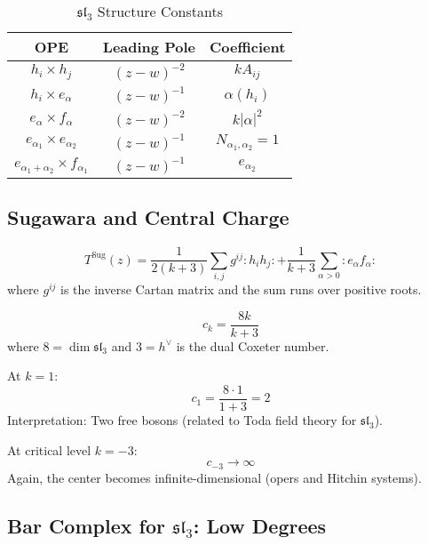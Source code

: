 \begin{table}[h]
\centering
\caption{$\mathfrak{sl}_3$ Structure Constants}
\begin{tabular}{|c|c|c|}
\hline
\textbf{OPE} & \textbf{Leading Pole} & \textbf{Coefficient} \\
\hline
$h_i \times h_j$ & $(z-w)^{-2}$ & $k A_{ij}$ \\
$h_i \times e_{\alpha}$ & $(z-w)^{-1}$ & $\alpha(h_i)$ \\
$e_{\alpha} \times f_{\alpha}$ & $(z-w)^{-2}$ & $k |\alpha|^2$ \\
$e_{\alpha_1} \times e_{\alpha_2}$ & $(z-w)^{-1}$ & $N_{\alpha_1,\alpha_2} = 1$ \\
$e_{\alpha_1+\alpha_2} \times f_{\alpha_1}$ & $(z-w)^{-1}$ & $e_{\alpha_2}$ \\
\hline
\end{tabular}
\end{table}

\subsection{Sugawara and Central Charge}

\begin{construction}
$$T^{\text{Sug}}(z) = \frac{1}{2(k+3)} \sum_{i,j} g^{ij} : h_i h_j : + \frac{1}{k+3} \sum_{\alpha > 0} : e_{\alpha} f_{\alpha} :$$
where $g^{ij}$ is the inverse Cartan matrix and the sum runs over positive roots.
\end{construction}

\begin{theorem}
$$c_k = \frac{8k}{k+3}$$
where $8 = \dim \mathfrak{sl}_3$ and $3 = h^\vee$ is the dual Coxeter number.
\end{theorem}

\begin{computation}
At $k=1$:
$$c_1 = \frac{8 \cdot 1}{1+3} = 2$$
Interpretation: Two free bosons (related to Toda field theory for $\mathfrak{sl}_3$).

At critical level $k = -3$:
$$c_{-3} \to \infty$$
Again, the center becomes infinite-dimensional (opers and Hitchin systems).
\end{computation}

\subsection{Bar Complex for $\mathfrak{sl}_3$: Low Degrees}

